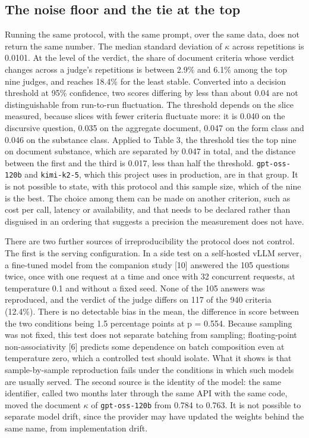 \documentclass{IOS-Book-Article}
\begin{document}
\subsection{The noise floor and the tie at the top}

Running the same protocol, with the same prompt, over the same data, does not return the same number. The median standard deviation of $\kappa$ across repetitions is 0.0101. At the level of the verdict, the share of document criteria whose verdict changes across a judge's repetitions is between 2.9\% and 6.1\% among the top nine judges, and reaches 18.4\% for the least stable. Converted into a decision threshold at 95\% confidence, two scores differing by less than about 0.04 are not distinguishable from run-to-run fluctuation. The threshold depends on the slice measured, because slices with fewer criteria fluctuate more: it is 0.040 on the discursive question, 0.035 on the aggregate document, 0.047 on the form class and 0.046 on the substance class. Applied to Table 3, the threshold ties the top nine on document substance, which are separated by 0.047 in total, and the distance between the first and the third is 0.017, less than half the threshold. \texttt{gpt-oss-120b} and \texttt{kimi-k2-5}, which this project uses in production, are in that group. It is not possible to state, with this protocol and this sample size, which of the nine is the best. The choice among them can be made on another criterion, such as cost per call, latency or availability, and that needs to be declared rather than disguised in an ordering that suggests a precision the measurement does not have.

There are two further sources of irreproducibility the protocol does not control. The first is the serving configuration. In a side test on a self-hosted vLLM server, a fine-tuned model from the companion study [10] answered the 105 questions twice, once with one request at a time and once with 32 concurrent requests, at temperature 0.1 and without a fixed seed. None of the 105 answers was reproduced, and the verdict of the judge differs on 117 of the 940 criteria (12.4\%). There is no detectable bias in the mean, the difference in score between the two conditions being 1.5 percentage points at p = 0.554. Because sampling was not fixed, this test does not separate batching from sampling; floating-point non-associativity [6] predicts some dependence on batch composition even at temperature zero, which a controlled test should isolate. What it shows is that sample-by-sample reproduction fails under the conditions in which such models are usually served. The second source is the identity of the model: the same identifier, called two months later through the same API with the same code, moved the document $\kappa$ of \texttt{gpt-oss-120b} from 0.784 to 0.763. It is not possible to separate model drift, since the provider may have updated the weights behind the same name, from implementation drift.
\end{document}
